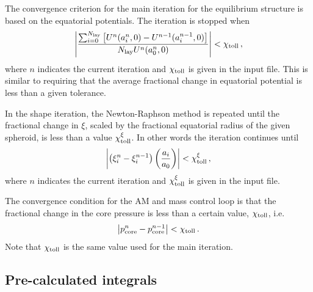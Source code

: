 \documentclass[11pt, oneside]{article}   	%
\begin{document}
The convergence criterion for the main iteration for the equilibrium structure is based on the equatorial potentials. 
The iteration is stopped when
%
\begin{align}
\left | \frac{ \sum_{i=0}^{N_{\rm lay}} \left [ U^n(a_i^n, 0) - U^{n-1}(a_i^{n-1}, 0)\right ] }{N_{\rm lay} U^n(a_0^n, 0)} \right | < \chi_{\rm toll} \,,
\end{align}
%
where $n$ indicates the current iteration and $\chi_{\rm toll}$ is given in the input file.
This is similar to requiring that the average fractional change in equatorial potential is less than a given tolerance. 

In the shape iteration, the Newton-Raphson method is repeated until the fractional change in $\xi$, scaled by the fractional equatorial radius of the given spheroid, is less than a value $\chi_{\rm toll}^{\xi}$.
In other words the iteration continues until
%
\begin{align}
\left | \left ( \xi_i^{n} -\xi_i^{n-1} \right ) \left ( \frac{a_i}{a_0} \right ) \right | < \chi_{\rm toll}^{\xi} \,,
\end{align}
%
where $n$ indicates the current iteration and $\chi_{\rm toll}^{\xi}$ is given in the input file.

The convergence condition for the AM and mass control loop is that the fractional change in the core pressure is less than a certain value, $\chi_{\rm toll}$, i.e.
%
\begin{align}
\left | p_{\rm core}^n - p_{\rm core}^{n-1} \right | < \chi_{\rm toll} \,.
\end{align}
%
Note that $\chi_{\rm toll}$ is the same value used for the main iteration.

\subsection{Pre-calculated integrals}
\label{HUG:sec:precalc}
\end{document}
